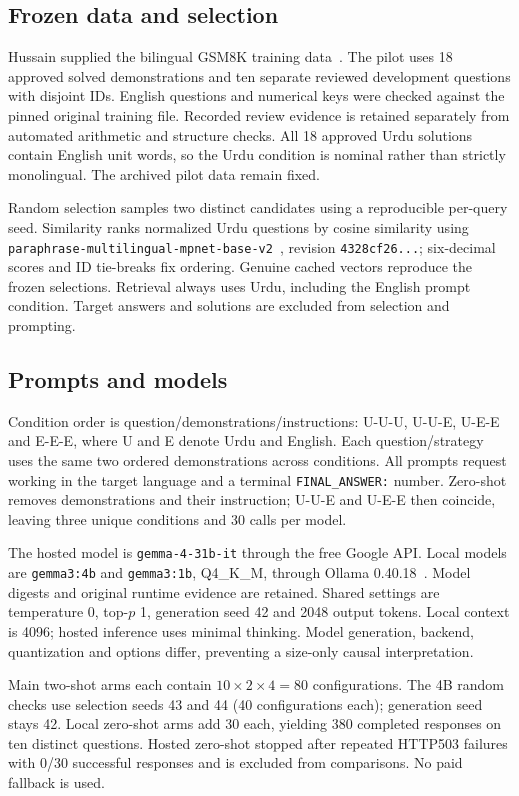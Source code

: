 \documentclass[conference]{IEEEtran}
\begin{document}
\subsection{Frozen data and selection}
Hussain supplied the bilingual GSM8K training data~\cite{cobbe}. The pilot uses 18 approved solved demonstrations and ten separate reviewed development questions with disjoint IDs. English questions and numerical keys were checked against the pinned original training file. Recorded review evidence is retained separately from automated arithmetic and structure checks. All 18 approved Urdu solutions contain English unit words, so the Urdu condition is nominal rather than strictly monolingual. The archived pilot data remain fixed.

Random selection samples two distinct candidates using a reproducible per-query seed. Similarity ranks normalized Urdu questions by cosine similarity using \texttt{paraphrase-multilingual-}\allowbreak\texttt{mpnet-base-v2}~\cite{encoder}, revision \texttt{4328cf26...}; six-decimal scores and ID tie-breaks fix ordering. Genuine cached vectors reproduce the frozen selections. Retrieval always uses Urdu, including the English prompt condition. Target answers and solutions are excluded from selection and prompting.

\subsection{Prompts and models}
Condition order is question/demonstrations/instructions: U-U-U, U-U-E, U-E-E and E-E-E, where U and E denote Urdu and English. Each question/strategy uses the same two ordered demonstrations across conditions. All prompts request working in the target language and a terminal \texttt{FINAL\_ANSWER:} number. Zero-shot removes demonstrations and their instruction; U-U-E and U-E-E then coincide, leaving three unique conditions and 30 calls per model.

The hosted model is \texttt{gemma-4-31b-it} through the free Google API. Local models are \texttt{gemma3:4b} and \texttt{gemma3:1b}, Q4\_K\_M, through Ollama 0.40.18~\cite{models}. Model digests and original runtime evidence are retained. Shared settings are temperature 0, top-$p$ 1, generation seed 42 and 2048 output tokens. Local context is 4096; hosted inference uses minimal thinking. Model generation, backend, quantization and options differ, preventing a size-only causal interpretation.

Main two-shot arms each contain $10\times2\times4=80$ configurations. The 4B random checks use selection seeds 43 and 44 (40 configurations each); generation seed stays 42. Local zero-shot arms add 30 each, yielding 380 completed responses on ten distinct questions. Hosted zero-shot stopped after repeated HTTP503 failures with 0/30 successful responses and is excluded from comparisons. No paid fallback is used.
\end{document}
